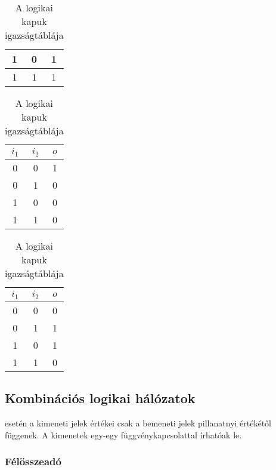 \documentclass[../../main.tex]{subfiles}
\begin{document}
\begin{table}[H]
\begin{minipage}[t]{0.166\textwidth}
\begin{center}
\begin{tabular}{|c|c|c|}
				\\ \hline
				1     & 0     & 1
				\\ \hline
				1     & 1     & 1
				\\ \hline
			\end{tabular}
		\end{center}
	\end{minipage}\hfill
	\begin{minipage}[t]{0.166\textwidth}
		\begin{center}
			\begin{tabular}{|c|c|c|}
				\hline
				$i_1$ & $i_2$ & $o$
				\\ \hline \hline
				0     & 0     & 1
				\\ \hline
				0     & 1     & 0
				\\ \hline
				1     & 0     & 0
				\\ \hline
				1     & 1     & 0
				\\ \hline
			\end{tabular}
		\end{center}
	\end{minipage}\hfill
	\begin{minipage}[t]{0.166\textwidth}
		\begin{center}
			\begin{tabular}{|c|c|c|}
				\hline
				$i_1$ & $i_2$ & $o$
				\\ \hline \hline
				0     & 0     & 0
				\\ \hline
				0     & 1     & 1
				\\ \hline
				1     & 0     & 1
				\\ \hline
				1     & 1     & 0
				\\ \hline
			\end{tabular}
		\end{center}
	\end{minipage}\hfill
	\caption{A logikai kapuk igazságtáblája}
	\label{table:truth-tables}
\end{table}

\subsection{Kombinációs logikai hálózatok}

 esetén a kimeneti jelek értékei csak a bemeneti
jelek pillanatnyi értékétől függenek. A kimenetek egy-egy függvénykapcsolattal
írhatóak le.

\subsubsection{Félösszeadó}
\end{document}
